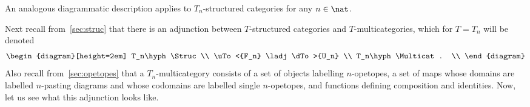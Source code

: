 An analogous diagrammatic description applies to $T_n$-structured
categories for any $n\in\nat$.

Next recall from~\ref{sec:struc} that there is an adjunction between
$T$-structured categories and $T$-multicategories, which for $T=T_n$ will
be denoted
\[
\begin{diagram}[height=2em]
T_n\hyph\Struc			\\
\uTo<{F_n} \ladj \dTo>{U_n}	\\
T_n\hyph\Multicat.		\\
\end{diagram}
\]
Also recall from~\ref{sec:opetopes} that a $T_n$-multicategory consists
of a set of objects labelling $n$-opetopes, a set of maps whose domains are
labelled $n$-pasting diagrams and whose codomains are labelled single
$n$-opetopes, and functions defining composition and identities.  Now, let
us see what this adjunction looks like.

